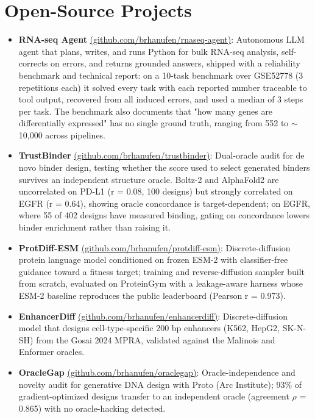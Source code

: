 \documentclass[10pt,a4paper]{article}
\begin{document}
\section{Open-Source Projects}

\begin{itemize}[leftmargin=1.2em, topsep=2pt, itemsep=2pt, parsep=0pt]
  \item \textbf{RNA-seq Agent} \href{https://github.com/brhanufen/rnaseq-agent}{(github.com/brhanufen/rnaseq-agent)}: Autonomous LLM agent that plans, writes, and runs Python for bulk RNA-seq analysis, self-corrects on errors, and returns grounded answers, shipped with a reliability benchmark and technical report: on a 10-task benchmark over GSE52778 (3 repetitions each) it solved every task with each reported number traceable to tool output, recovered from all induced errors, and used a median of 3 steps per task. The benchmark also documents that "how many genes are differentially expressed" has no single ground truth, ranging from 552 to $\sim$10,000 across pipelines.
  \item \textbf{TrustBinder} \href{https://github.com/brhanufen/trustbinder}{(github.com/brhanufen/trustbinder)}: Dual-oracle audit for de novo binder design, testing whether the score used to select generated binders survives an independent structure oracle. Boltz-2 and AlphaFold2 are uncorrelated on PD-L1 (r = 0.08, 100 designs) but strongly correlated on EGFR (r = 0.64), showing oracle concordance is target-dependent; on EGFR, where 55 of 402 designs have measured binding, gating on concordance lowers binder enrichment rather than raising it.
  \item \textbf{ProtDiff-ESM} \href{https://github.com/brhanufen/protdiff-esm}{(github.com/brhanufen/protdiff-esm)}: Discrete-diffusion protein language model conditioned on frozen ESM-2 with classifier-free guidance toward a fitness target; training and reverse-diffusion sampler built from scratch, evaluated on ProteinGym with a leakage-aware harness whose ESM-2 baseline reproduces the public leaderboard (Pearson r = 0.973).
  \item \textbf{EnhancerDiff} \href{https://github.com/brhanufen/enhancerdiff}{(github.com/brhanufen/enhancerdiff)}: Discrete-diffusion model that designs cell-type-specific 200 bp enhancers (K562, HepG2, SK-N-SH) from the Gosai 2024 MPRA, validated against the Malinois and Enformer oracles.
  \item \textbf{OracleGap} \href{https://github.com/brhanufen/oraclegap}{(github.com/brhanufen/oraclegap)}: Oracle-independence and novelty audit for generative DNA design with Proto (Arc Institute); 93\% of gradient-optimized designs transfer to an independent oracle (agreement $\rho$ = 0.865) with no oracle-hacking detected.

\end{itemize}
\end{document}
